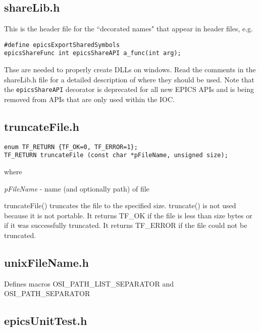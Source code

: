 \subsection{shareLib.h}

This is the header file for the ``decorated names" that appear in header files, e.g.

\begin{verbatim}
#define epicsExportSharedSymbols
epicsShareFunc int epicsShareAPI a_func(int arg);
\end{verbatim}

Thse are needed to properly create DLLs on windows.
Read the comments in the shareLib.h file for a detailed description of where they should be used.
Note that the \verb|epicsShareAPI| decorator is deprecated for all new EPICS APIs and is being removed from APIs that are only used within the IOC.

\subsection{truncateFile.h}

\begin{verbatim}
enum TF_RETURN {TF_OK=0, TF_ERROR=1};
TF_RETURN truncateFile (const char *pFileName, unsigned size);
\end{verbatim}

where

\begin{description}
\item \emph{pFileName} - name (and optionally path) of file

\end{description}

truncateFile() truncates the file to the specified size.
truncate() is not used because it is not portable.
It returns TF\_OK if the file is less than size bytes or if it was successfully truncated.
It returns TF\_ERROR if the file could not be truncated.

\subsection{unixFileName.h}

Defines macros OSI\_PATH\_LIST\_SEPARATOR and OSI\_PATH\_SEPARATOR

\subsection{epicsUnitTest.h}


